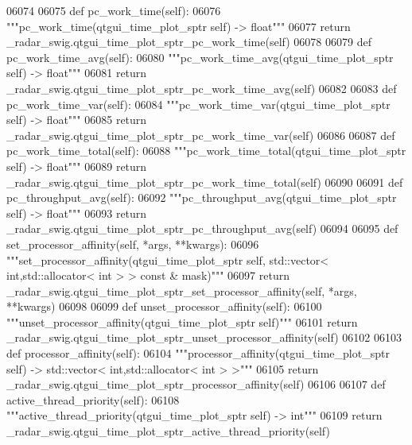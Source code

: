 \begin{DoxyCode}
{{{{{{{{{{{{{{{{{{{{06074 
06075     \textcolor{keyword}{def }pc_work_time(self):
06076         \textcolor{stringliteral}{"""pc\_work\_time(qtgui\_time\_plot\_sptr self) -> float"""}
06077         \textcolor{keywordflow}{return} \_radar\_swig.qtgui\_time\_plot\_sptr\_pc\_work\_time(self)
06078 
06079     \textcolor{keyword}{def }pc_work_time_avg(self):
06080         \textcolor{stringliteral}{"""pc\_work\_time\_avg(qtgui\_time\_plot\_sptr self) -> float"""}
06081         \textcolor{keywordflow}{return} \_radar\_swig.qtgui\_time\_plot\_sptr\_pc\_work\_time\_avg(self)
06082 
06083     \textcolor{keyword}{def }pc_work_time_var(self):
06084         \textcolor{stringliteral}{"""pc\_work\_time\_var(qtgui\_time\_plot\_sptr self) -> float"""}
06085         \textcolor{keywordflow}{return} \_radar\_swig.qtgui\_time\_plot\_sptr\_pc\_work\_time\_var(self)
06086 
06087     \textcolor{keyword}{def }pc_work_time_total(self):
06088         \textcolor{stringliteral}{"""pc\_work\_time\_total(qtgui\_time\_plot\_sptr self) -> float"""}
06089         \textcolor{keywordflow}{return} \_radar\_swig.qtgui\_time\_plot\_sptr\_pc\_work\_time\_total(self)
06090 
06091     \textcolor{keyword}{def }pc_throughput_avg(self):
06092         \textcolor{stringliteral}{"""pc\_throughput\_avg(qtgui\_time\_plot\_sptr self) -> float"""}
06093         \textcolor{keywordflow}{return} \_radar\_swig.qtgui\_time\_plot\_sptr\_pc\_throughput\_avg(self)
06094 
06095     \textcolor{keyword}{def }set_processor_affinity(self, *args, **kwargs):
06096         \textcolor{stringliteral}{"""set\_processor\_affinity(qtgui\_time\_plot\_sptr self, std::vector< int,std::allocator< int > > const
       & mask)"""}
06097         \textcolor{keywordflow}{return} \_radar\_swig.qtgui\_time\_plot\_sptr\_set\_processor\_affinity(self, *args, **kwargs)
06098 
06099     \textcolor{keyword}{def }unset_processor_affinity(self):
06100         \textcolor{stringliteral}{"""unset\_processor\_affinity(qtgui\_time\_plot\_sptr self)"""}
06101         \textcolor{keywordflow}{return} \_radar\_swig.qtgui\_time\_plot\_sptr\_unset\_processor\_affinity(self)
06102 
06103     \textcolor{keyword}{def }processor_affinity(self):
06104         \textcolor{stringliteral}{"""processor\_affinity(qtgui\_time\_plot\_sptr self) -> std::vector< int,std::allocator< int > >"""}
06105         \textcolor{keywordflow}{return} \_radar\_swig.qtgui\_time\_plot\_sptr\_processor\_affinity(self)
06106 
06107     \textcolor{keyword}{def }active_thread_priority(self):
06108         \textcolor{stringliteral}{"""active\_thread\_priority(qtgui\_time\_plot\_sptr self) -> int"""}
06109         \textcolor{keywordflow}{return} \_radar\_swig.qtgui\_time\_plot\_sptr\_active\_thread\_priority(self)
}}}}}}}}}}}}}}}}}}}}
\end{DoxyCode}
